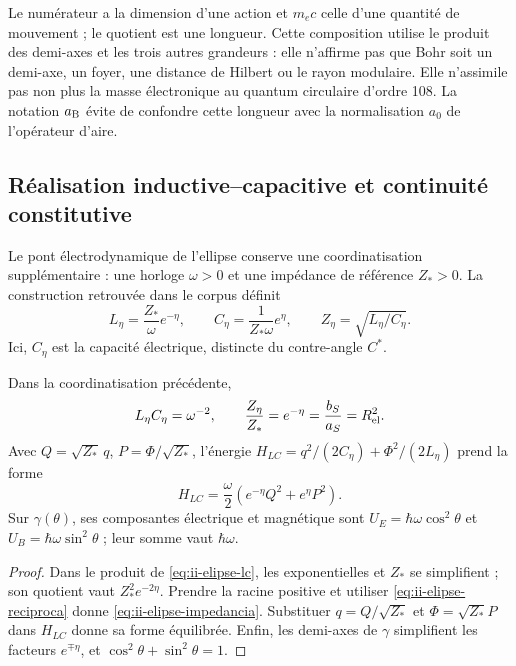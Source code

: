 Le numérateur a la dimension d'une action et \(m_ec\) celle d'une quantité de mouvement ; le
quotient est une longueur. Cette composition utilise le produit des
demi-axes et les trois autres grandeurs : elle n'affirme pas que Bohr soit un demi-axe,
un foyer, une distance de Hilbert ou le rayon modulaire. Elle n'assimile pas non plus
la masse électronique au quantum circulaire d'ordre 108. La notation
\(a_{\rm B}\) évite de confondre cette longueur avec la normalisation
\(a_0\) de l'opérateur d'aire.

\subsection{Réalisation inductive--capacitive et continuité constitutive}
\label{sec:ii-elipse-lc}

Le pont électrodynamique de l’ellipse conserve une coordinatisation supplémentaire :
une horloge \(\omega>0\) et une impédance de référence \(Z_*>0\).
La construction retrouvée dans le corpus définit
\begin{equation}
 L_\eta=\frac{Z_*}{\omega}e^{-\eta},\qquad
 C_\eta=\frac{1}{Z_*\omega}e^\eta,
 \qquad Z_\eta=\sqrt{L_\eta/C_\eta}.
 \label{eq:ii-elipse-lc}
\end{equation}
Ici, \(C_\eta\) est la capacité électrique, distincte du contre-angle \(C^*\).
\begin{proposition}
\label{prop:ii-elipse-lc}
Dans la coordinatisation précédente,
\begin{equation}
 L_\eta C_\eta=\omega^{-2},\qquad
 \frac{Z_\eta}{Z_*}=e^{-\eta}
 =\frac{b_S}{a_S}=R_{\rm el}^{2}.
 \label{eq:ii-elipse-impedancia}
\end{equation}
Avec \(Q=\sqrt{Z_*}\,q\), \(P=\Phi/\sqrt{Z_*}\), l'énergie
\(H_{LC}=q^2/(2C_\eta)+\Phi^2/(2L_\eta)\) prend la forme
\[
 H_{LC}=\frac\omega2(e^{-\eta}Q^2+e^\eta P^2).
\]
Sur \(\gamma(\theta)\), ses composantes électrique et magnétique sont
\(U_E=\hbar\omega\cos^2\theta\) et
\(U_B=\hbar\omega\sin^2\theta\) ; leur somme vaut \(\hbar\omega\).
\end{proposition}
\begin{proof}
Dans le produit de \eqref{eq:ii-elipse-lc}, les exponentielles et
\(Z_*\) se simplifient ; son quotient vaut \(Z_*^2e^{-2\eta}\). Prendre la racine
positive et utiliser \eqref{eq:ii-elipse-reciproca} donne
\eqref{eq:ii-elipse-impedancia}. Substituer \(q=Q/\sqrt{Z_*}\)
et \(\Phi=\sqrt{Z_*}P\) dans \(H_{LC}\) donne sa forme équilibrée.
Enfin, les demi-axes de \(\gamma\) simplifient les facteurs
\(e^{\mp\eta}\), et \(\cos^2\theta+\sin^2\theta=1\).
\end{proof}

